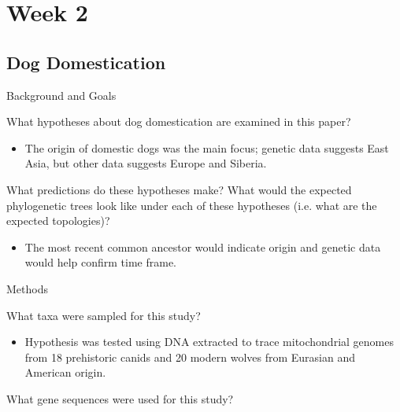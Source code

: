 \documentclass[12pt,a4paper]{article}
\begin{document}
\clearpage
\section*{Week 2}
{}
\subsection{Dog Domestication}
\begin{itemize}
    \item Background and Goals
        \begin{itemize}
            {\color{darklc} \item What hypotheses about dog domestication are examined in this paper?}
                \begin{itemize}
                    \item The origin of domestic dogs was the main focus; genetic data suggests East Asia, but other data suggests Europe and Siberia. 
                \end{itemize}
            {\color{darklc} \item  What predictions do these hypotheses make? What would the expected phylogenetic trees look like under each of these hypotheses (i.e. what are the expected topologies)?}
                \begin{itemize}
                    \item The most recent common ancestor would indicate origin and genetic data would help confirm time frame.
                \end{itemize}
        \end{itemize}
    \item Methods
        \begin{itemize}
            {\color{darklc} \item  What taxa were sampled for this study?} 
                \begin{itemize}
                    \item Hypothesis was tested using DNA extracted to trace mitochondrial genomes from 18 prehistoric canids and 20 modern wolves from Eurasian and American origin. 
                \end{itemize}
            {\color{darklc} \item  What gene sequences were used for this study?}

\end{itemize}
\end{itemize}
\end{document}
